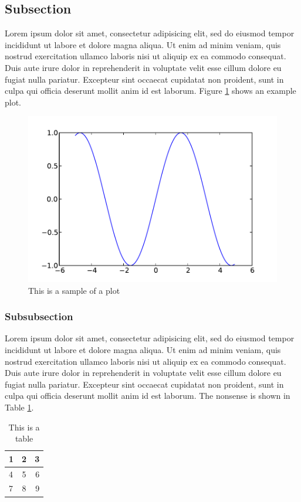\documentclass{UCFthesis}
\begin{document}
\subsection{Subsection}
Lorem ipsum dolor sit amet, consectetur adipisicing elit, sed do eiusmod tempor incididunt ut labore et dolore magna aliqua. Ut enim ad minim veniam, quis nostrud exercitation ullamco laboris nisi ut aliquip ex ea commodo consequat. Duis aute irure dolor in reprehenderit in voluptate velit esse cillum dolore eu fugiat nulla pariatur. Excepteur sint occaecat cupidatat non proident, sunt in culpa qui officia deserunt mollit anim id est laborum.  Figure \ref{plot} shows an example plot.

\begin{figure}[ht]
\includegraphics[width=1\linewidth]{plot.pdf}
\caption{This is a sample of a plot}
\label{plot}
\end{figure}

\subsubsection{Subsubsection}
Lorem ipsum dolor sit amet, consectetur adipisicing elit, sed do eiusmod tempor incididunt ut labore et dolore magna aliqua. Ut enim ad minim veniam, quis nostrud exercitation ullamco laboris nisi ut aliquip ex ea commodo consequat. Duis aute irure dolor in reprehenderit in voluptate velit esse cillum dolore eu fugiat nulla pariatur. Excepteur sint occaecat cupidatat non proident, sunt in culpa qui officia deserunt mollit anim id est laborum.  The nonsense is shown in Table \ref{table}.

\begin{table}[ht]
\caption{This is a table}
\label{table}
\begin{tabular}{ l c r }
  1 & 2 & 3 \\ \hline
  4 & 5 & 6 \\
  7 & 8 & 9 \\
\end{tabular}
\end{table}
	
\end{document}
